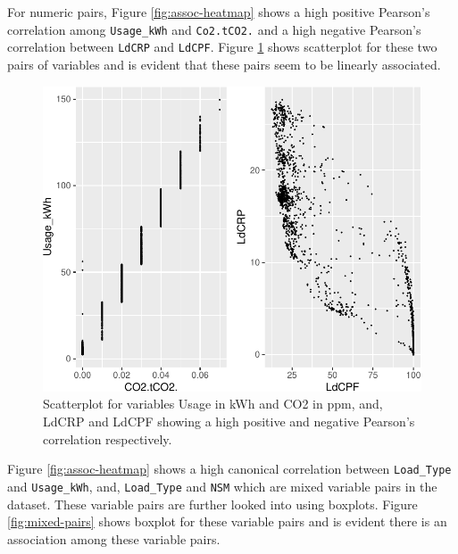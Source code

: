 For numeric pairs, Figure \ref{fig:assoc-heatmap} shows a high positive
Pearson's correlation among \texttt{Usage\_kWh} and \texttt{Co2.tCO2.}
and a high negative Pearson's correlation between \texttt{LdCRP} and
\texttt{LdCPF}. Figure \ref{fig:numeric-pairs} shows scatterplot for
these two pairs of variables and is evident that these pairs seem to be
linearly associated.

\begin{Schunk}
\begin{figure}

{\centering \includegraphics{rj_paper_files/figure-latex/numeric-pairs-1} 

}

\caption[Scatterplot for variables Usage in kWh and CO2 in ppm, and, LdCRP and LdCPF showing a high positive and negative Pearson's correlation respectively]{Scatterplot for variables Usage in kWh and CO2 in ppm, and, LdCRP and LdCPF showing a high positive and negative Pearson's correlation respectively.}\label{fig:numeric-pairs}
\end{figure}
\end{Schunk}

Figure \ref{fig:assoc-heatmap} shows a high canonical correlation
between \texttt{Load\_Type} and \texttt{Usage\_kWh}, and,
\texttt{Load\_Type} and \texttt{NSM} which are mixed variable pairs in
the dataset. These variable pairs are further looked into using
boxplots. Figure \ref{fig:mixed-pairs} shows boxplot for these variable
pairs and is evident there is an association among these variable pairs.

